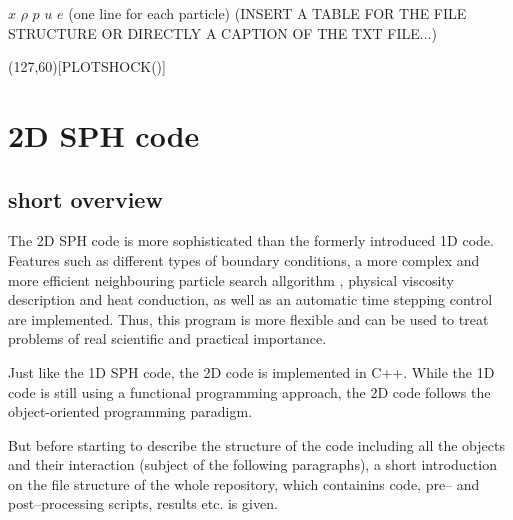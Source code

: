 \documentclass{report}
\begin{document}
$x$ $\rho$ $p$ $u$ $e$
(one line for each particle)
(INSERT A TABLE FOR THE FILE STRUCTURE OR DIRECTLY A CAPTION OF THE TXT FILE...)
\vspace{5mm}
\sProofOn
\begin{struktogramm}(127,60)[PLOTSHOCK()]
  \whileend
\end{struktogramm}
\sProofOff


\section{2D SPH code}
\label{sec:2DSPHcode}
\subsection{short overview}
The 2D SPH code is more sophisticated than the formerly introduced 1D code. Features such as different types of boundary conditions, a more complex and more efficient neighbouring particle search allgorithm , physical viscosity description and heat conduction, as well as an automatic time stepping control are implemented. Thus, this program is more flexible and can be used to treat problems of real scientific and practical importance. 

Just like the 1D SPH code, the 2D code is implemented in C++. While the 1D code is still using a functional programming approach, the 2D code follows the object-oriented programming paradigm.

But before starting to describe the structure of the code including all the objects and their interaction (subject of the following paragraphs), a short introduction on the file structure of the whole repository, which containins code, pre-- and post--processing scripts, results etc. is given.
\end{document}
